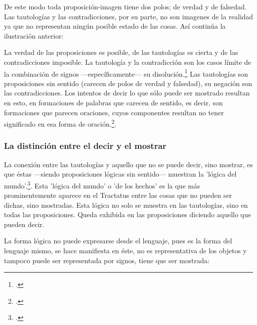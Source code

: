       De este modo toda proposición-imagen tiene dos polos; de verdad y de falsedad.
      Las tautologías y las contradicciones, por su parte, no son imagenes de la
      realidad ya que no representan ningún posible estado de las cosas. Así continúa
      la ilustración anterior:


      La verdad de las proposiciones es posible, de las tautologías es cierta y de las
      contradicciones imposible. La tautología y la contradicción son los casos límite
      de la combinación de signos ---específicamente--- su
      disolución.\footcite[cf.~][4.464 y 4.466]{tractatus} Las tautologías son
      proposiciones sin sentido (carecen de polos de verdad y falsedad), su negación son
      las contradicciones. Los intentos de decir lo que sólo puede ser mostrado
      resultan en esto, en formaciones de palabras que carecen de sentido, es decir,
      son formaciones que parecen oraciones, cuyos componentes resultan no tener
      significado en esa forma de oración.\footcite[cf.~][p.~163~\S2]{IWT}.

      \subsubsection{La distinción entre el decir y el mostrar}
      La conexión entre las tautologías y aquello que no se puede decir, sino mostrar,
      es que éstas ---siendo proposiciones lógicas sin sentido--- muestran la 'lógica del
      mundo'.\footcite[cf.~][p.~163~\S3]{IWT}. Esta 'lógica del mundo' o 'de los
      hechos' es la que más prominentemente aparece en el Tractatus entre las cosas
      que no pueden ser dichas, sino mostradas. Esta lógica no solo se muestra en las
      tautologías, sino en todas las proposiciones. Queda exhibida en las proposiciones
      diciendo aquello que pueden decir. 

      La forma lógica no puede expresarse desde el lenguaje, pues es la forma del
      lenguaje mismo, se hace manifiesta en éste, no es representativa de los objetos
      y tampoco puede ser representada por signos, tiene que ser mostrada:

